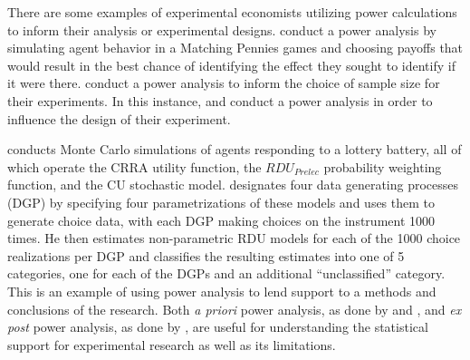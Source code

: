 \documentclass[../main.tex]{subfiles}
\begin{document}
There are some examples of experimental economists utilizing power calculations to inform their analysis or experimental designs.
\textcite{Rutstrom2009} conduct a power analysis by simulating agent behavior in a Matching Pennies games and choosing payoffs that would result in the best chance of identifying the effect they sought to identify if it were there.
\textcite[2]{Brown2016} conduct a power analysis to inform the choice of sample size for their experiments.
In this instance, \textcite{Rutstrom2009} and \textcite{Brown2016} conduct a power analysis in order to influence the design of their experiment.

\textcite[8]{Wilcox2015} conducts Monte Carlo simulations of agents responding to a lottery battery, all of which operate the CRRA utility function, the $\mathit{RDU_{Prelec}}$ probability weighting function, and the CU stochastic model.
\textcite{Wilcox2015} designates four data generating processes (DGP) by specifying four parametrizations of these models and uses them to generate choice data, with each DGP making choices on the instrument 1000 times.
He then estimates non-parametric RDU models for each of the 1000 choice realizations per DGP and classifies the resulting estimates into one of 5 categories, one for each of the DGPs and an additional \enquote{unclassified} category.
This is an example of using power analysis to lend support to a methods and conclusions of the research.
Both \textit{a priori} power analysis, as done by \textcite{Rutstrom2009} and \textcite{Brown2016}, and \textit{ex post} power analysis, as done by \textcite{Wilcox2015}, are useful for understanding the statistical support for experimental research as well as its limitations.
\end{document}
